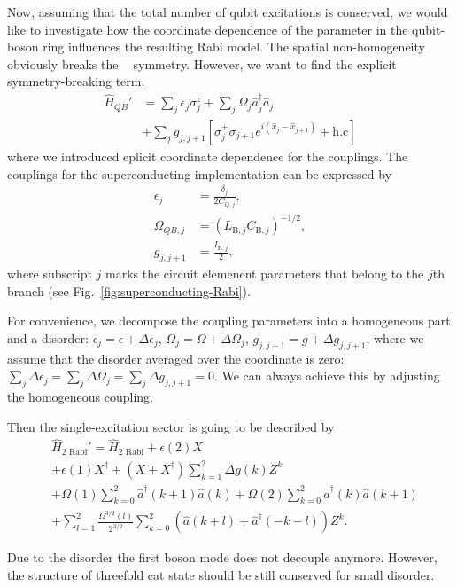 \documentclass[reprint, aps, prx, amsmath, amssymb, longbibliography, superscriptaddress]{revtex4-2}
\DeclareMathOperator{\Zthree}{\mathbb{Z}_3}
\begin{document}
Now, assuming that the total number of qubit excitations is conserved, we would like to investigate how the coordinate dependence of the parameter in the qubit-boson ring influences the resulting Rabi model. The spatial non-homogeneity obviously breaks the $\Zthree$ symmetry. However, we want to find the explicit symmetry-breaking term.
\begin{equation}
\label{eq:rabi-breaking-disorder}
\begin{aligned}
  \hat H_{QB}' &= \sum_j \epsilon_{j} \sigma_j^z + \sum_j \Omega_j \hat a^{\dagger}_j \hat a_j  \\
  &+ \sum_j g_{j,j+1} \left[\sigma_j^+ \sigma_{j+1}^- e^{i (\hat x_j - \hat x_{j+1})} +\text{h.c}\right]
\end{aligned}
\end{equation}
where we introduced eplicit coordinate dependence for the couplings. The couplings for the superconducting implementation can be expressed by 
\begin{equation}
\begin{aligned}
    \epsilon_j &= \frac{\delta_j}{2 C_{Q,j}}, \\
    \Omega_{QB,j} &= \left(L_{\text{B},j}C_{\text{B},j}\right)^{-1/2}, \\
    g_{j,j+1} &= \frac{I_{\text{R},j}}{2},
\end{aligned}
\end{equation}
where subscript $j$ marks the circuit elemenent parameters that belong to the $j$th branch (see Fig.~\ref{fig:superconducting-Rabi}).

For convenience, we decompose the coupling parameters into a homogeneous part and a disorder: $\epsilon_j = \epsilon + \Delta \epsilon_j$, $\Omega_j = \Omega + \Delta \Omega_j$, $g_{j,j+1} = g + \Delta g_{j,j+1}$, where we assume that the disorder averaged over the coordinate is zero: $\sum_j \Delta \epsilon_j =  \sum_j \Delta \Omega_j = \sum_j \Delta g_{j,j+1} =0$. We can always achieve this by adjusting the homogeneous coupling.

Then the single-excitation sector is going to be described by
\begin{equation}
\begin{aligned}
    &\hat H_{\text{2 Rabi}}' = \hat H_{\text{2 Rabi}} + \epsilon(2) X \\
    &+\epsilon(1)  X^{\dagger} + (X + X^{\dagger}) \sum\limits_{k=1}^2 \Delta g(k) Z^k\\
    &+ \Omega(1) \sum\limits_{k=0}^2 \hat a^{\dagger}(k+1) \hat a(k) + \Omega(2) \sum\limits_{k=0}^2 \hat a^{\dagger}(k) \hat a(k+1) \\
    &+ \sum\limits_{l=1}^2 \frac{\Omega^{3/2}(l)}{2^{3/2}} \sum\limits_{k=0}^2 (\hat a(k+l) + \hat a^{\dagger}(-k-l)) Z^k.
\end{aligned}
\end{equation}

Due to the disorder the first boson mode does not decouple anymore. However, the structure of threefold cat state should be still conserved for small disorder. 




\end{document}
